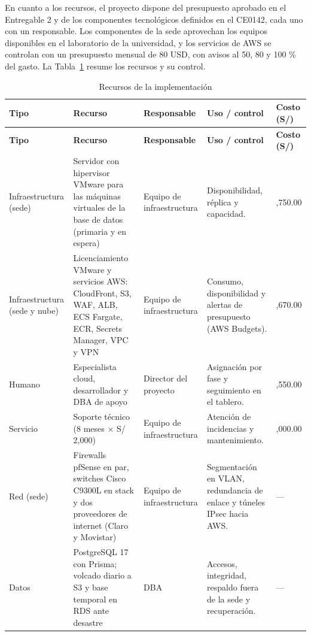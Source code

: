 En cuanto a los recursos, el proyecto dispone del presupuesto aprobado en el Entregable 2 y de los componentes tecnológicos definidos en el CE0142, cada uno con un responsable. Los componentes de la sede aprovechan los equipos disponibles en el laboratorio de la universidad, y los servicios de AWS se controlan con un presupuesto mensual de 80 USD, con avisos al 50, 80 y 100 \% del gasto. La Tabla~\ref{tab:cap4-4} resume los recursos y su control.


{\small
\renewcommand{\arraystretch}{1.3}
\begin{longtable}{|>{\raggedright\arraybackslash}p{2.26cm}|>{\raggedright\arraybackslash}p{4.68cm}|>{\raggedright\arraybackslash}p{1.95cm}|>{\raggedright\arraybackslash}p{4.68cm}|>{\raggedright\arraybackslash}p{1.01cm}|}
\caption{Recursos de la implementación}\label{tab:cap4-4}\\
\hline
\textbf{Tipo} & \textbf{Recurso} & \textbf{Responsable} & \textbf{Uso / control} & \textbf{Costo (S/)} \\
\hline
\endfirsthead
\hline
\textbf{Tipo} & \textbf{Recurso} & \textbf{Responsable} & \textbf{Uso / control} & \textbf{Costo (S/)} \\
\hline
\endhead
Infraestructura (sede) & Servidor con hipervisor VMware para las máquinas virtuales de la base de datos (primaria y en espera) & Equipo de infraestructura & Disponibilidad, réplica y capacidad. & 6,750.00 \\
\hline
Infraestructura (sede y nube) & Licenciamiento VMware y servicios AWS: CloudFront, S3, WAF, ALB, ECS Fargate, ECR, Secrets Manager, VPC y VPN & Equipo de infraestructura & Consumo, disponibilidad y alertas de presupuesto (AWS Budgets). & 20,670.00 \\
\hline
Humano & Especialista cloud, desarrollador y DBA de apoyo & Director del proyecto & Asignación por fase y seguimiento en el tablero. & 2,550.00 \\
\hline
Servicio & Soporte técnico (8 meses $\times$ S/ 2,000) & Equipo de infraestructura & Atención de incidencias y mantenimiento. & 16,000.00 \\
\hline
Red (sede) & Firewalls pfSense en par, switches Cisco C9300L en stack y dos proveedores de internet (Claro y Movistar) & Equipo de infraestructura & Segmentación en VLAN, redundancia de enlace y túneles IPsec hacia AWS. & — \\
\hline
Datos & PostgreSQL 17 con Prisma; volcado diario a S3 y base temporal en RDS ante desastre & DBA & Accesos, integridad, respaldo fuera de la sede y recuperación. & — \\

\end{longtable}}
